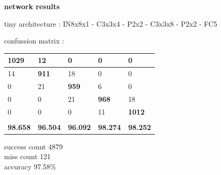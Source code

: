 \documentclass[xcolor=dvipsnames]{beamer}
\begin{document}
\begin{frame}{\bf network results}

tiny architecture :
IN8x8x1 - C3x3x4 - P2x2 - C3x3x8 - P2x2 - FC5


confussion matrix :

\begin{table}[]
\begin{tabular}{|l|l|l|l|l|}
\hline
\textbf{1029}   & 12              & 0               & 0               & 0               \\ \hline
14              & \textbf{911}    & 18              & 0               & 0               \\ \hline
0               & 21              & \textbf{959}    & 6               & 0               \\ \hline
0               & 0               & 21              & \textbf{968}    & 18              \\ \hline
0               & 0               & 0               & 11              & \textbf{1012}   \\ \hline
                &                 &                 &                 &                 \\ \hline
\textbf{98.658} & \textbf{96.504} & \textbf{96.092} & \textbf{98.274} & \textbf{98.252} \\ \hline
\end{tabular}
\end{table}

success count     4879 \\
miss count         121 \\
accuracy         97.58\% \\

\end{frame}
\end{document}

